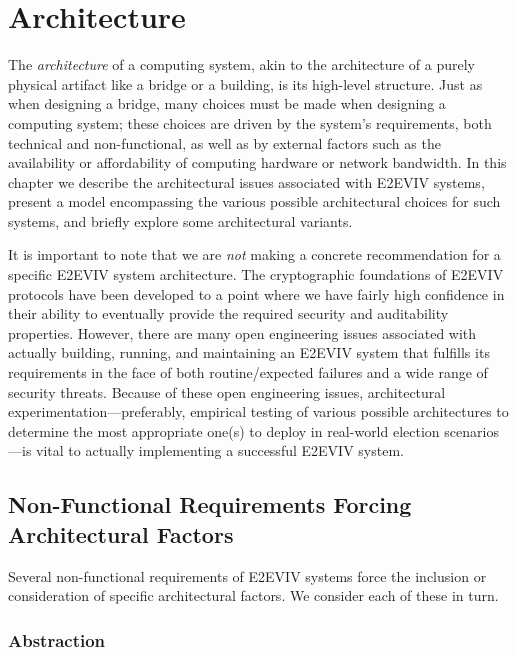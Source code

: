 \chapter{Architecture}
\label{chapter:architecture}

The \emph{architecture} of a computing system, akin to the
architecture of a purely physical artifact like a bridge or a
building, is its high-level structure. Just as when designing a
bridge, many choices must be made when designing a computing system;
these choices are driven by the system's requirements, both technical
and non-functional, as well as by external factors such as the
availability or affordability of computing hardware or network
bandwidth. In this chapter we describe the architectural issues
associated with E2EVIV systems, present a model encompassing the
various possible architectural choices for such systems, and briefly
explore some architectural variants.

It is important to note that we are \emph{not} making a concrete
recommendation for a specific E2EVIV system architecture. The
cryptographic foundations of E2EVIV protocols have been developed to a
point where we have fairly high confidence in their ability to
eventually provide the required security and auditability
properties. However, there are many open engineering issues associated
with actually building, running, and maintaining an E2EVIV system that
fulfills its requirements in the face of both routine/expected
failures and a wide range of security threats. Because of these open
engineering issues, architectural experimentation---preferably,
empirical testing of various possible architectures to determine the
most appropriate one(s) to deploy in real-world election
scenarios---is vital to actually implementing a successful E2EVIV
system.

\section{Non-Functional Requirements Forcing Architectural Factors}

Several non-functional requirements of E2EVIV systems force the
inclusion or consideration of specific architectural factors. We
consider each of these in turn.

\subsection{Abstraction}

